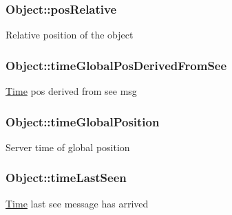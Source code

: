 \subsubsection[{\texorpdfstring{pos\+Relative}{posRelative}}]{ Object\+::pos\+Relative\hspace{0.3cm}{\ttfamily [protected]}}\hypertarget{classObject_afc3fa9f935ff0e47ea8057f742ea623c}{}\label{classObject_afc3fa9f935ff0e47ea8057f742ea623c}
Relative position of the object 
\subsubsection[{\texorpdfstring{time\+Global\+Pos\+Derived\+From\+See}{timeGlobalPosDerivedFromSee}}]{ Object\+::time\+Global\+Pos\+Derived\+From\+See\hspace{0.3cm}{\ttfamily [protected]}}\hypertarget{classObject_a2f113089a45a792db77b03e16b8152a1}{}\label{classObject_a2f113089a45a792db77b03e16b8152a1}
\hyperlink{classTime}{Time} pos derived from see msg 
\subsubsection[{\texorpdfstring{time\+Global\+Position}{timeGlobalPosition}}]{ Object\+::time\+Global\+Position\hspace{0.3cm}{\ttfamily [protected]}}\hypertarget{classObject_a8892e8727938cdde9c00348848e39b53}{}\label{classObject_a8892e8727938cdde9c00348848e39b53}
Server time of global position 
\subsubsection[{\texorpdfstring{time\+Last\+Seen}{timeLastSeen}}]{ Object\+::time\+Last\+Seen\hspace{0.3cm}{\ttfamily [protected]}}\hypertarget{classObject_ac119901c38bac85c71027606f36cd38d}{}\label{classObject_ac119901c38bac85c71027606f36cd38d}
\hyperlink{classTime}{Time} last see message has arrived 
